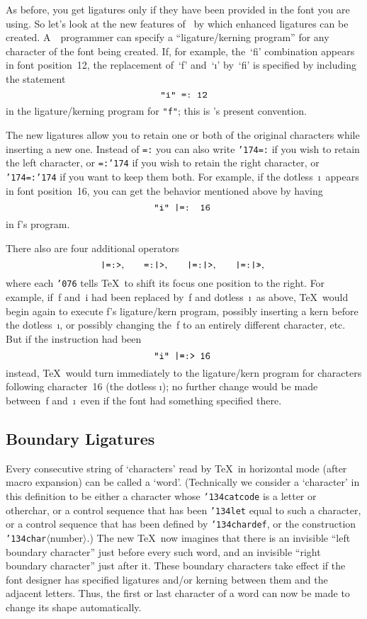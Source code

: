 As before, you get ligatures only if they have been provided in the font
you are using. So let's look at the new features of \MF\ by which
enhanced ligatures can be created. A~\MF\ programmer can specify a
``ligature/kerning program'' for any character of the font being
created. If, for example, the~`fi' combination appears in font
position~12, the replacement of~`f' and~`\i' by~`fi' is specified by
including the statement
$$\hbox{\tt{"i"~=:~12}}$$
in the ligature/kerning program for {\tt{"f"}}; this is \MF's present
convention.

The new ligatures allow you to retain one or both of the original characters
while inserting a new one. Instead of {\tt{=:}} you can also write
{\tt{\char'174}=:} if you wish to retain the left character, or
{\tt{=:{\char'174}}} if you wish to retain the right character,
or {\tt{\char'174}=:{\char'174}} if you want to keep them both.
For example, if the dotless~\i\ appears in font position~16, you can
get the behavior mentioned above by having
$$\hbox{%
{\tt{"i" {\char'174}=: 16}}
}$$
in f's program.

There also are four additional operators
$$\hbox{%
{\tt{\char'174}=:{\char'076}},\qquad
{\tt{=:{\char'174\char'076}}},\qquad
{\tt{\char'174}=:{\char'174\char'076}},\qquad
{\tt{\char'174}=:{\char'174\char'076\char'076}},
}$$
where each {\tt\char'076} tells \TeX\ to shift its focus one position
to the right. For example, if~f and~i had been replaced by~f
and dotless~\i\ as above, \TeX\ would begin again to execute f's
ligature/kern program, possibly inserting a kern before the dotless~\i,
or possibly changing the~f to an entirely different character, etc.
But if the instruction had been
$$\hbox{%
{\tt{"i" {\char'174}=:{\char'076} 16}}
}$$
instead, \TeX\ would turn immediately to the ligature/kern program for
characters following character~16 (the dotless \i);
no further change would be made between~f and~\i\ even if the font
had something specified there.

\subsection{Boundary Ligatures}

Every consecutive string of `characters' read by \TeX\ in horizontal mode
(after macro expansion) can be called a `word'. (Technically we consider
a `character' in this definition to be either a character whose
{\tt{\char'134}catcode}
is a
letter or otherchar, or a control sequence that has been
{\tt{\char'134}let}
equal to such a character, or a control sequence that has been defined by
{\tt{\char'134}chardef},
or the construction
{\tt{\char'134}char}$\langle$number$\rangle$.)
The new \TeX\ now imagines that there is an invisible ``left boundary
character'' just before every such word, and an invisible ``right boundary
character'' just after it. These boundary characters take effect if the font
designer has specified ligatures and/or kerning between them and the
adjacent letters. Thus, the first or last character of a word can 
now be made to change its shape automatically.

